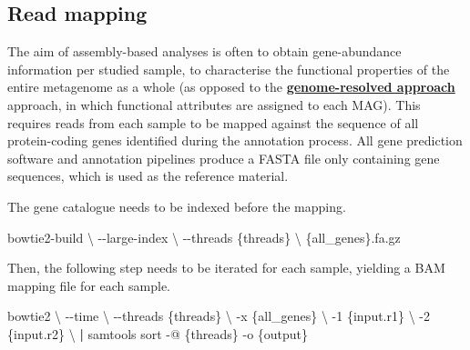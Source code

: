 \documentclass[
]{book}
\newenvironment{Shaded}{\begin{snugshade}}{\end{snugshade}}
\newcommand{\AttributeTok}[1]{\textcolor[rgb]{0.77,0.63,0.00}{#1}}
\newcommand{\DataTypeTok}[1]{\textcolor[rgb]{0.13,0.29,0.53}{#1}}
\newcommand{\ExtensionTok}[1]{#1}
\newcommand{\KeywordTok}[1]{\textcolor[rgb]{0.13,0.29,0.53}{\textbf{#1}}}
\newcommand{\NormalTok}[1]{#1}
\begin{document}
\hypertarget{assembly-read-mapping}{%
\subsection*{Read mapping}\label{assembly-read-mapping}}

The aim of assembly-based analyses is often to obtain gene-abundance information per studied sample, to characterise the functional properties of the entire metagenome as a whole (as opposed to the \textbf{\protect\hyperlink{genome-resolved}{genome-resolved approach}} approach, in which functional attributes are assigned to each MAG). This requires reads from each sample to be mapped against the sequence of all protein-coding genes identified during the annotation process. All gene prediction software and annotation pipelines produce a FASTA file only containing gene sequences, which is used as the reference material.

The gene catalogue needs to be indexed before the mapping.

\small

\begin{Shaded}
\begin{Highlighting}[]
\ExtensionTok{bowtie2{-}build} \DataTypeTok{\textbackslash{}}
      \AttributeTok{{-}{-}large{-}index} \DataTypeTok{\textbackslash{}}
      \AttributeTok{{-}{-}threads}\NormalTok{ \{threads\} }\DataTypeTok{\textbackslash{}}
\NormalTok{       \{all\_genes\}.fa.gz}
\end{Highlighting}
\end{Shaded}

\normalsize

Then, the following step needs to be iterated for each sample, yielding a BAM mapping file for each sample.

\small

\begin{Shaded}
\begin{Highlighting}[]
\ExtensionTok{bowtie2} \DataTypeTok{\textbackslash{}}
      \AttributeTok{{-}{-}time} \DataTypeTok{\textbackslash{}}
      \AttributeTok{{-}{-}threads}\NormalTok{ \{threads\} }\DataTypeTok{\textbackslash{}}
      \AttributeTok{{-}x}\NormalTok{ \{all\_genes\} }\DataTypeTok{\textbackslash{}}
      \AttributeTok{{-}1}\NormalTok{ \{input.r1\} }\DataTypeTok{\textbackslash{}}
      \AttributeTok{{-}2}\NormalTok{ \{input.r2\} }\DataTypeTok{\textbackslash{}}
      \KeywordTok{|} \ExtensionTok{samtools}\NormalTok{ sort }\AttributeTok{{-}@}\NormalTok{ \{threads\} }\AttributeTok{{-}o}\NormalTok{ \{output\}}
\end{Highlighting}
\end{Shaded}
\end{document}
